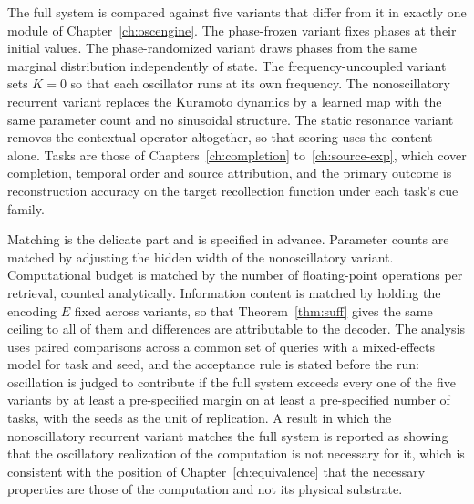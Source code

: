 The full system is compared against five variants that differ from it in exactly one module of Chapter~\ref{ch:oscengine}. The phase-frozen variant fixes phases at their initial values. The phase-randomized variant draws phases from the same marginal distribution independently of state. The frequency-uncoupled variant sets $K=0$ so that each oscillator runs at its own frequency. The nonoscillatory recurrent variant replaces the Kuramoto dynamics by a learned map with the same parameter count and no sinusoidal structure. The static resonance variant removes the contextual operator altogether, so that scoring uses the content alone. Tasks are those of Chapters~\ref{ch:completion} to~\ref{ch:source-exp}, which cover completion, temporal order and source attribution, and the primary outcome is reconstruction accuracy on the target recollection function under each task's cue family.

Matching is the delicate part and is specified in advance. Parameter counts are matched by adjusting the hidden width of the nonoscillatory variant. Computational budget is matched by the number of floating-point operations per retrieval, counted analytically. Information content is matched by holding the encoding $E$ fixed across variants, so that Theorem~\ref{thm:suff} gives the same ceiling to all of them and differences are attributable to the decoder. The analysis uses paired comparisons across a common set of queries with a mixed-effects model for task and seed, and the acceptance rule is stated before the run: oscillation is judged to contribute if the full system exceeds every one of the five variants by at least a pre-specified margin on at least a pre-specified number of tasks, with the seeds as the unit of replication. A result in which the nonoscillatory recurrent variant matches the full system is reported as showing that the oscillatory realization of the computation is not necessary for it, which is consistent with the position of Chapter~\ref{ch:equivalence} that the necessary properties are those of the computation and not its physical substrate.

